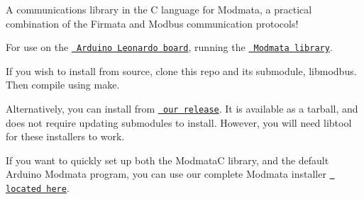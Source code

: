 A communications library in the C language for Modmata, a practical combination of the Firmata and Modbus communication protocols! ~\newline


For use on the \href{https://docs.arduino.cc/hardware/leonardo}{\texttt{ Arduino Leonardo board}}, running the \href{https://github.com/shutch42/modmata}{\texttt{ Modmata library}}. ~\newline


If you wish to install from source, clone this repo and it\textquotesingle{}s submodule, libmodbus. Then compile using {\ttfamily make}. ~\newline


Alternatively, you can install from \href{https://github.com/shutch42/ModmataC/releases/tag/v1}{\texttt{ our release}}. It is available as a tarball, and does not require updating submodules to install. However, you will need libtool for these installers to work.

If you want to quickly set up both the ModmataC library, and the default Arduino Modmata program, you can use our complete Modmata installer \href{https://github.com/shutch42/Modmata-Complete-Install}{\texttt{ located here}}. ~\newline
 